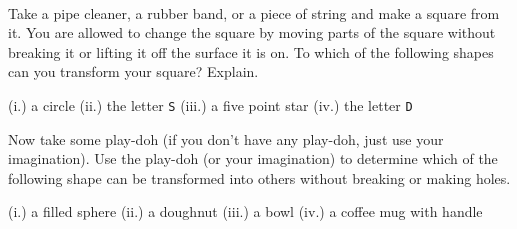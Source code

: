 \begin{activity} \label{act:rubber_sheet} ~
\ba
\item Take a pipe cleaner, a rubber band, or a piece of string and make a square from it. You are allowed to change the square by moving parts of the square without breaking it or lifting it off the surface it is on. To which of the following shapes can you transform your square? Explain. 
\begin{center}
(i.) a circle \qquad (ii.) the letter \texttt{S} \qquad (iii.) a five point star {} \qquad (iv.) the letter \texttt{D} 
\end{center}


\item Now take some play-doh (if you don't have any play-doh, just use your imagination). Use the play-doh (or your imagination) to determine which of the following shape can be transformed into others without breaking or making holes.
\begin{center}
(i.) a filled sphere  \qquad (ii.) a doughnut \qquad (iii.) a bowl \qquad (iv.) a coffee mug with handle
\end{center}

\ea

\end{activity}

